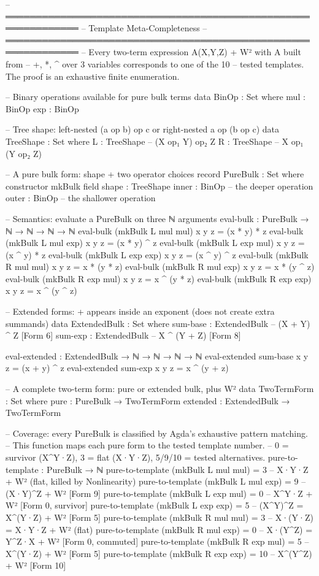 \documentclass[11pt,a4paper]{article}
\begin{document}
\begin{code}
-- ══════════════════════════════════════════════════════════════
-- Template Meta-Completeness
-- ══════════════════════════════════════════════════════════════
-- Every two-term expression A(X,Y,Z) + W² with A built from
-- {+, *, ^} over 3 variables corresponds to one of the 10
-- tested templates.  The proof is an exhaustive finite enumeration.

-- Binary operations available for pure bulk terms
data BinOp : Set where
  mul : BinOp
  exp : BinOp

-- Tree shape: left-nested (a op b) op c  or  right-nested a op (b op c)
data TreeShape : Set where
  L : TreeShape     -- (X op₁ Y) op₂ Z
  R : TreeShape     -- X op₁ (Y op₂ Z)

-- A pure bulk form: shape + two operator choices
record PureBulk : Set where
  constructor mkBulk
  field
    shape : TreeShape
    inner : BinOp     -- the deeper operation
    outer : BinOp     -- the shallower operation

-- Semantics: evaluate a PureBulk on three ℕ arguments
eval-bulk : PureBulk → ℕ → ℕ → ℕ → ℕ
eval-bulk (mkBulk L mul mul) x y z = (x * y) * z
eval-bulk (mkBulk L mul exp) x y z = (x * y) ^ z
eval-bulk (mkBulk L exp mul) x y z = (x ^ y) * z
eval-bulk (mkBulk L exp exp) x y z = (x ^ y) ^ z
eval-bulk (mkBulk R mul mul) x y z = x * (y * z)
eval-bulk (mkBulk R mul exp) x y z = x * (y ^ z)
eval-bulk (mkBulk R exp mul) x y z = x ^ (y * z)
eval-bulk (mkBulk R exp exp) x y z = x ^ (y ^ z)

-- Extended forms: + appears inside an exponent (does not create extra summands)
data ExtendedBulk : Set where
  sum-base : ExtendedBulk     -- (X + Y) ^ Z       [Form 6]
  sum-exp  : ExtendedBulk     -- X ^ (Y + Z)       [Form 8]

eval-extended : ExtendedBulk → ℕ → ℕ → ℕ → ℕ
eval-extended sum-base x y z = (x + y) ^ z
eval-extended sum-exp  x y z = x ^ (y + z)

-- A complete two-term form: pure or extended bulk, plus W²
data TwoTermForm : Set where
  pure     : PureBulk     → TwoTermForm
  extended : ExtendedBulk → TwoTermForm

-- Coverage: every PureBulk is classified by Agda's exhaustive pattern matching.
-- This function maps each pure form to the tested template number.
-- 0 = survivor (X^Y·Z), 3 = flat (X·Y·Z), 5/9/10 = tested alternatives.
pure-to-template : PureBulk → ℕ
pure-to-template (mkBulk L mul mul) = 3     -- X·Y·Z + W²  (flat, killed by Nonlinearity)
pure-to-template (mkBulk L mul exp) = 9     -- (X·Y)^Z + W²  [Form 9]
pure-to-template (mkBulk L exp mul) = 0     -- X^Y·Z + W²   [Form 0, survivor]
pure-to-template (mkBulk L exp exp) = 5     -- (X^Y)^Z = X^(Y·Z) + W²  [Form 5]
pure-to-template (mkBulk R mul mul) = 3     -- X·(Y·Z) = X·Y·Z + W²  (flat)
pure-to-template (mkBulk R mul exp) = 0     -- X·(Y^Z) = Y^Z·X + W²  [Form 0, commuted]
pure-to-template (mkBulk R exp mul) = 5     -- X^(Y·Z) + W²  [Form 5]
pure-to-template (mkBulk R exp exp) = 10    -- X^(Y^Z) + W²  [Form 10]


\end{code}
\end{document}
